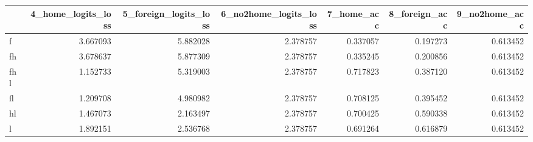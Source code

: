 \begin{tabular}{lrrrrrr}
\toprule
 & 4_home_logits_loss & 5_foreign_logits_loss & 6_no2home_logits_loss & 7_home_acc & 8_foreign_acc & 9_no2home_acc \\
\midrule
f & 3.667093 & 5.882028 & 2.378757 & 0.337057 & 0.197273 & 0.613452 \\
fh & 3.678637 & 5.877309 & 2.378757 & 0.335245 & 0.200856 & 0.613452 \\
fhl & 1.152733 & 5.319003 & 2.378757 & 0.717823 & 0.387120 & 0.613452 \\
fl & 1.209708 & 4.980982 & 2.378757 & 0.708125 & 0.395452 & 0.613452 \\
hl & 1.467073 & 2.163497 & 2.378757 & 0.700425 & 0.590338 & 0.613452 \\
l & 1.892151 & 2.536768 & 2.378757 & 0.691264 & 0.616879 & 0.613452 \\
\bottomrule
\end{tabular}
